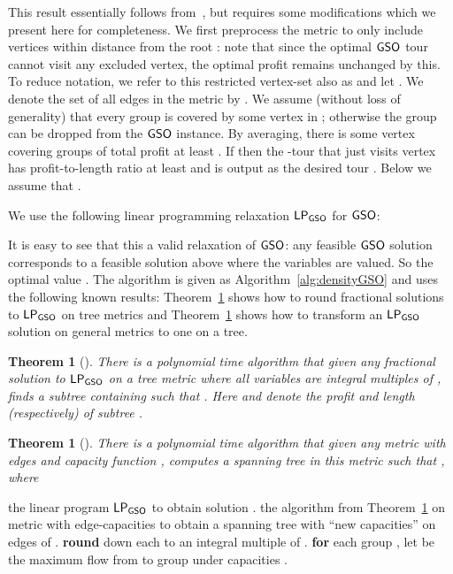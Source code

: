 \documentclass[11pt]{article}
\newtheorem{theorem}[thm]{Theorem}
\def\gso{\ensuremath{{\sf GSO}}\xspace}
\newenvironment{pf}{

\noindent{\bf Proof:}} {\hfill


}
\begin{document}
\begin{pf} This result essentially follows from~\cite{ccgg}, but requires some modifications  which we present here for completeness. 
We first preprocess the metric to only include
  vertices within distance  from the root : note that since the
  optimal \gso tour cannot visit any excluded vertex, the optimal profit
  remains unchanged by this. To reduce notation, we refer to this restricted vertex-set also as  and let .
  We denote the set of all edges in the metric by .
We assume (without loss of generality) that every group is covered by some vertex in ; otherwise the group can be dropped from the \gso instance. By averaging, there  is some vertex  covering groups of total profit at least . If  then the -tour that just visits vertex  has profit-to-length ratio at least  and is output as the desired tour . Below we assume that . 

\def\lpgo{\ensuremath{\mathsf{LP}_\gso}\xspace}

We use the following linear programming relaxation \lpgo for \gso:
      
It is easy to see that this a valid relaxation of \gso: any feasible \gso solution corresponds to a feasible solution above where the  variables are  valued. So the optimal value . The algorithm is given as Algorithm~\ref{alg:densityGSO} and uses the following known results: Theorem~\ref{thm:ccgg} shows how to round fractional solutions to \lpgo on tree metrics and Theorem~\ref{thm:frt} shows how to transform an \lpgo solution on general metrics to one on a tree. 
\begin{theorem}[\cite{ccgg}]\label{thm:ccgg}
There is a polynomial time algorithm that given any fractional solution  to \lpgo on a tree metric where all variables are integral multiples of , finds a subtree  containing  such that . Here   and  denote the profit and length (respectively) of subtree .
\end{theorem}


\begin{theorem}[\cite{FRT03}]\label{thm:frt} There is a polynomial time algorithm that given any metric  with edges  and capacity function , computes a spanning tree  in this metric such that , where

\end{theorem}



\begin{algorithm}[!h]
  \caption{Algorithm for \gso maximizing profit-to-length ratio.}
\label{alg:densityGSO}
\begin{algorithmic}[1]
     the linear program \lpgo to obtain solution .
     the algorithm from Theorem~\ref{thm:frt} on metric  with edge-capacities  to obtain a spanning tree  with ``new capacities''  on edges of . 
 \STATE \label{step:gso-round} {\bf round} down each  to an integral multiple of .
    \STATE \label{step:gso-flow} {\bf for} each group , let  be
      the maximum flow from  to group  under  
      capacities .
      

\end{algorithmic}
\end{algorithm}
\end{pf}
\end{document}
